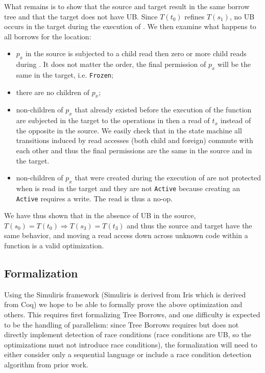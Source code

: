 \documentclass[a4paper,11pt]{article}
\theoremstyle{plain}
\theoremstyle{definition}
\theoremstyle{remark}
\newcommand{\tcode}[1]{\rstinline{#1}}
\newcommand{\tperm}[1]{\texttt{#1}}
\begin{document}
What remains is to show that the source and target result in the same
borrow tree and that the target does not have UB. Since \(T(t_0)\) refines
\(T(s_1)\), no UB occurs in the target during the execution of \tcode{g}.
We then examine what happens to all borrows for the location:
\begin{itemize}
    \item \(p_x\) in the source is subjected to a child read then zero or more
        child reads during \tcode{g}. It does not matter the order, the final
        permission of \(p_x\) will be the same in the target, i.e. \tperm{Frozen};
    \item there are no children of \(p_x\);
    \item non-children of \(p_x\) that already existed before the execution
        of the function are subjected in the target to the operations in \tcode{g}
        then a read of \(t_x\) instead of the opposite in the source. We easily
        check that in the state machine all transitions induced by read accesses
        (both child and foreign) commute with each other and thus the final
        permissions are the same in the source and in the target.
    \item non-children of \(p_x\) that were created during the execution of \tcode{g}
        are not protected when \tcode{*x} is read in the target and they are not
        \tperm{Active} because creating an \tperm{Active} requires a write.
        The read is thus a no-op.
\end{itemize}

We have thus shown that in the absence of UB in the source,
\(T(s_0) = T(t_0) \Longrightarrow T(s_3) = T(t_3)\) and
thus the source and target have the same behavior, and moving a read access
down across unknown code within a function is a valid optimization.

\subsection{Formalization}

Using the Simuliris framework \cite{simuliris} (Simuliris is derived from Iris which is derived from Coq)
we hope to be able to formally prove the above optimization and others.
This requires first formalizing Tree Borrows, and one difficulty is expected to be
the handling of parallelism: since Tree Borrows requires but does not directly implement
detection of race conditions (race conditions are UB, so the optimizations must
not introduce race conditions), the formalization will need to either consider
only a sequential language or include a race condition detection algorithm from prior work.
\end{document}
